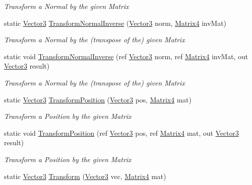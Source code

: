 \begin{DoxyCompactItemize}
\begin{DoxyCompactList}\small\item\em Transform a Normal by the given Matrix\end{DoxyCompactList}\item 
static \hyperlink{struct_open_t_k_1_1_vector3}{Vector3} \hyperlink{struct_open_t_k_1_1_vector3_a1ea130f503735fb10be916e64861a9d6}{Transform\-Normal\-Inverse} (\hyperlink{struct_open_t_k_1_1_vector3}{Vector3} norm, \hyperlink{struct_open_t_k_1_1_matrix4}{Matrix4} inv\-Mat)
\begin{DoxyCompactList}\small\item\em Transform a Normal by the (transpose of the) given Matrix\end{DoxyCompactList}\item 
static void \hyperlink{struct_open_t_k_1_1_vector3_ace10748b0b3a42c350e2756875c948f9}{Transform\-Normal\-Inverse} (ref \hyperlink{struct_open_t_k_1_1_vector3}{Vector3} norm, ref \hyperlink{struct_open_t_k_1_1_matrix4}{Matrix4} inv\-Mat, out \hyperlink{struct_open_t_k_1_1_vector3}{Vector3} result)
\begin{DoxyCompactList}\small\item\em Transform a Normal by the (transpose of the) given Matrix\end{DoxyCompactList}\item 
static \hyperlink{struct_open_t_k_1_1_vector3}{Vector3} \hyperlink{struct_open_t_k_1_1_vector3_aa2ddae26f8d2e64c1cdacb332423b403}{Transform\-Position} (\hyperlink{struct_open_t_k_1_1_vector3}{Vector3} pos, \hyperlink{struct_open_t_k_1_1_matrix4}{Matrix4} mat)
\begin{DoxyCompactList}\small\item\em Transform a Position by the given Matrix\end{DoxyCompactList}\item 
static void \hyperlink{struct_open_t_k_1_1_vector3_a22e2d8fb4d21b4c9987a28f17b6aeb07}{Transform\-Position} (ref \hyperlink{struct_open_t_k_1_1_vector3}{Vector3} pos, ref \hyperlink{struct_open_t_k_1_1_matrix4}{Matrix4} mat, out \hyperlink{struct_open_t_k_1_1_vector3}{Vector3} result)
\begin{DoxyCompactList}\small\item\em Transform a Position by the given Matrix\end{DoxyCompactList}\item 
static \hyperlink{struct_open_t_k_1_1_vector3}{Vector3} \hyperlink{struct_open_t_k_1_1_vector3_a5701f33c48e2b49d0cb69a71c1345b7e}{Transform} (\hyperlink{struct_open_t_k_1_1_vector3}{Vector3} vec, \hyperlink{struct_open_t_k_1_1_matrix4}{Matrix4} mat)

\end{DoxyCompactItemize}
